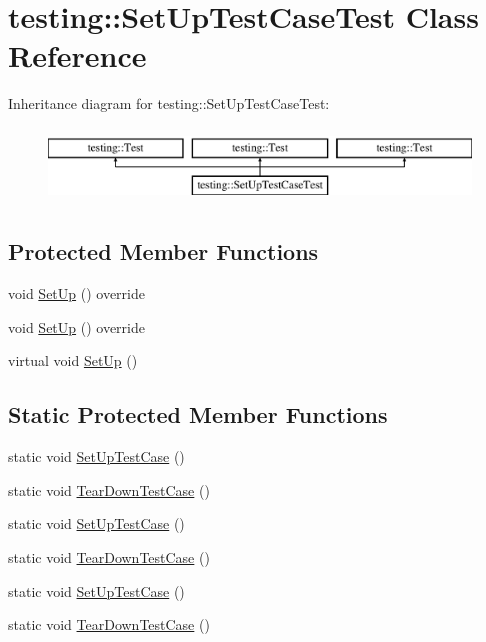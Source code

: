\hypertarget{classtesting_1_1_set_up_test_case_test}{}\section{testing\+::Set\+Up\+Test\+Case\+Test Class Reference}
\label{classtesting_1_1_set_up_test_case_test}
Inheritance diagram for testing\+::Set\+Up\+Test\+Case\+Test\+:\begin{figure}[H]
\begin{center}
\leavevmode
\includegraphics[height=2.000000cm]{de/d40/classtesting_1_1_set_up_test_case_test}
\end{center}
\end{figure}
\subsection*{Protected Member Functions}
\begin{DoxyCompactItemize}
\item 
void \mbox{\hyperlink{classtesting_1_1_set_up_test_case_test_a5ceda206e569e436d71b2084333d23b1}{Set\+Up}} () override
\item 
void \mbox{\hyperlink{classtesting_1_1_set_up_test_case_test_a5ceda206e569e436d71b2084333d23b1}{Set\+Up}} () override
\item 
virtual void \mbox{\hyperlink{classtesting_1_1_set_up_test_case_test_a4b44551ccf73e66de7ec95b2ab3b2085}{Set\+Up}} ()
\end{DoxyCompactItemize}
\subsection*{Static Protected Member Functions}
\begin{DoxyCompactItemize}
\item 
static void \mbox{\hyperlink{classtesting_1_1_set_up_test_case_test_a50732abc0bcb3725e6dfd6a2d487e944}{Set\+Up\+Test\+Case}} ()
\item 
static void \mbox{\hyperlink{classtesting_1_1_set_up_test_case_test_abdc133cd161ff2fa317f489da9bdccf3}{Tear\+Down\+Test\+Case}} ()
\item 
static void \mbox{\hyperlink{classtesting_1_1_set_up_test_case_test_a50732abc0bcb3725e6dfd6a2d487e944}{Set\+Up\+Test\+Case}} ()
\item 
static void \mbox{\hyperlink{classtesting_1_1_set_up_test_case_test_abdc133cd161ff2fa317f489da9bdccf3}{Tear\+Down\+Test\+Case}} ()
\item 
static void \mbox{\hyperlink{classtesting_1_1_set_up_test_case_test_a50732abc0bcb3725e6dfd6a2d487e944}{Set\+Up\+Test\+Case}} ()
\item 
static void \mbox{\hyperlink{classtesting_1_1_set_up_test_case_test_abdc133cd161ff2fa317f489da9bdccf3}{Tear\+Down\+Test\+Case}} ()
\end{DoxyCompactItemize}
